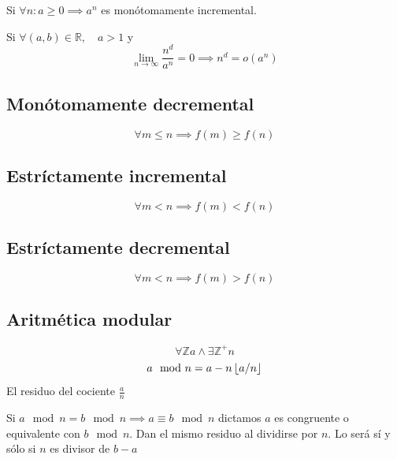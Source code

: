 \documentclass[tikz,11pt,fleqn]{book} %
\begin{document}
\begin{definition}
    Si $\forall n: a\ge0\implies a^n$ es monótomamente incremental.
    
    Si $\forall(a,b) \in \mathbb R,\quad a>1$ y
    $$ \lim_{n\to\infty}\frac{n^d}{a^n}=0 \implies n^d=o(a^n)$$
\end{definition}

\subsection{Monótomamente decremental}
\begin{definition}
    $$\forall 	 m\le   n \implies  f(m)\ge  f(n)$$
\end{definition}
\subsection{Estríctamente incremental}
\begin{definition}
    $$\forall 	 m<   n \implies  f(m)<  f(n)$$
\end{definition}
\subsection{Estríctamente decremental}
\begin{definition}
    $$\forall 	 m<   n \implies  f(m)>  f(n)$$
\end{definition}

\subsection{Aritmética modular}
\begin{theorem}
    $$\forall \mathbb Z a \land \exists\mathbb Z^+ n$$
    $$ a\mod{n}=a-n\left\lfloor a/n \right\rfloor$$
    El residuo del cociente $\frac an$
\end{theorem}
\begin{theorem}[Equivalencias]
    Si $a\mod n = b\mod n\implies a\equiv b \mod n$
    dictamos $a$ es congruente o equivalente con $b\mod n$. Dan el mismo residuo al dividirse por $n$. Lo será sí y sólo si $n$ es divisor de $b-a$
\end{theorem}
\end{document}
